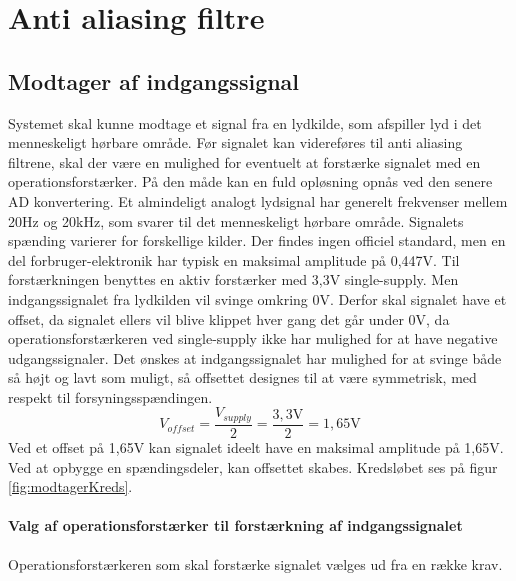 \chapter{Anti aliasing filtre}\label{kap:aafiltre}
\vspace*{.5cm}

\section{Modtager af indgangssignal}
Systemet skal kunne modtage et signal fra en lydkilde, som afspiller lyd i det menneskeligt hørbare område. 
Før signalet kan videreføres til anti aliasing filtrene, skal der være en mulighed for eventuelt at forstærke signalet med en operationsforstærker. 
På den måde kan en fuld opløsning opnås ved den senere AD konvertering. 
\newline
Et almindeligt analogt lydsignal har generelt frekvenser mellem 20Hz og 20kHz, som svarer til det menneskeligt hørbare område. 
Signalets spænding varierer for forskellige kilder. 
Der findes ingen officiel standard, men en del forbruger-elektronik har typisk en maksimal amplitude på 0,447V.\cite{wikiLine} 
\newline
Til forstærkningen benyttes en aktiv forstærker med 3,3V single-supply. 
Men indgangssignalet fra lydkilden vil svinge omkring 0V. 
Derfor skal signalet have et offset, da signalet ellers vil blive klippet hver gang det går under 0V, da operationsforstærkeren ved single-supply ikke har mulighed for at have negative udgangssignaler. 
Det ønskes at indgangssignalet har mulighed for at svinge både så højt og lavt som muligt, så offsettet designes til at være symmetrisk, med respekt til  forsyningsspændingen. 
\begin{equation}
	{V_{offset}} = \frac{V_{supply}}{2} = \frac{3,3\text{V}}{2} = 1,65\text{V}
\end{equation}
Ved et offset på 1,65V kan signalet ideelt have en maksimal amplitude på 1,65V. 
Ved at opbygge en spændingsdeler, kan offsettet skabes. Kredsløbet ses på figur \ref{fig:modtagerKreds}.

\subsubsection{Valg af operationsforstærker til forstærkning af indgangssignalet}
Operationsforstærkeren som skal forstærke signalet vælges ud fra en række krav. 

